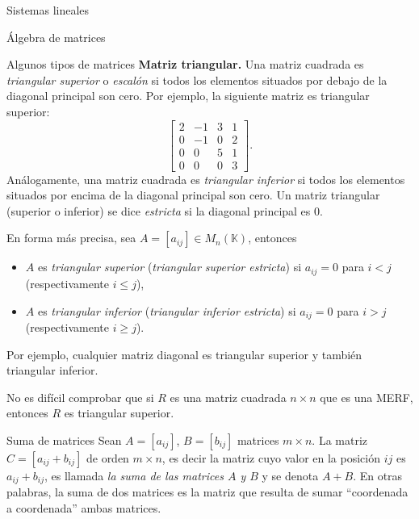 \documentclass[a4paper,12pt,twoside,spanish,reqno]{amsbook}
\numberwithin{equation}{section}
\theoremstyle{definition}
\theoremstyle{remark}
\newcommand{\K}{\mathbb K}
\begin{document}
\begin{chapter}{Sistemas lineales}
\begin{section}{Álgebra de matrices}
\begin{subsection}{Algunos tipos de matrices}
                \textbf{Matriz triangular.} Una matriz cuadrada es \textit{triangular superior} o \textit{escalón} si todos los elementos situados por debajo de la diagonal principal son cero. Por ejemplo, la siguiente matriz es triangular superior:
                \begin{equation}
                \begin{bmatrix}
                2&-1&3&1\\0&-1&0&2\\0&0&5&1\\0&0&0&3
                \end{bmatrix}.
                \end{equation}
                Análogamente, una matriz cuadrada es \textit{triangular inferior} si todos los elementos situados por encima de la diagonal principal son cero. Un matriz triangular (superior o inferior) se dice \textit{estricta} si la diagonal principal es 0.
                
                En forma más precisa, sea $A =[a_{ij}]\in M_n(\K)$,  entonces
                \begin{itemize}
                    \item $A$ es \textit{triangular superior} (\textit{triangular superior estricta}) si $a_{ij} =0$ para $i < j$ (respectivamente $i \le j$),
                    \item $A$ es \textit{triangular inferior} (\textit{triangular inferior estricta}) si $a_{ij} =0$ para $i > j$ (respectivamente $i \ge j$).
                \end{itemize}
                
                Por  ejemplo, cualquier matriz diagonal es triangular superior y también triangular inferior. 
                
                No es difícil comprobar que si $R$ es una matriz cuadrada $n \times n$  que es una MERF,  entonces $R$  es triangular superior. 
                
             
            \end{subsection}
            
            
            \begin{subsection}{Suma  de matrices}
                Sean $A=[a_{ij}]$, $B=[b_{ij}]$ matrices  $m \times n$. La matriz $C= [a_{ij} + b_{ij}]$ de orden $m \times n$,  es decir la matriz cuyo valor en la posición $ij$ es  $a_{ij} + b_{ij}$, es llamada \textit{la suma de las matrices $A$ y $B$} y se denota $A+B$. En otras palabras, la suma de dos matrices es la matriz que resulta de sumar ``coordenada a coordenada'' ambas matrices. 
                

\end{subsection}
\end{section}
\end{chapter}
\end{document}
